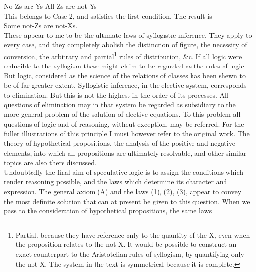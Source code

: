 \documentclass{article}
\begin{document}
{{{{No Zs are Ys \hspace*{.4in} All Zs are not-Ys\vspace{.1in}\\
\hspace*{.2in}
This belongs to Case 2, and satisfies the first condition. The result is\vspace{.1in}\\
\hspace*{.2in} Some not-Zs are not-Xs.\vspace{.1in}\\
\hspace*{.2in}
These appear to me to be the ultimate laws of syllogistic inference. They
apply to every case, and they completely abolish the distinction of figure, the
necessity of conversion, the arbitrary and partial\footnote[5]{\footnotesize{Partial, because they have reference only to the quantity of the X, even when the proposition
relates to the not-X. It would be possible to construct an exact counterpart to the
Aristotelian rules of syllogism, by quantifying only the not-X. The system in the text is
symmetrical because it is complete.}} rules of distribution, \&c. If
all logic were reducible to the syllogism these might claim to be regarded as
the rules of logic. But logic, considered as the science of the relations of classes 
has been shewn to be of far greater extent. Syllogistic inference, in the elective
system, corresponds to elimination. But this is not the highest in the order
of its processes. All questions of elimination may in that system be regarded
as subsidiary to the more general problem of the solution of elective equations.
To this problem all questions of logic and of reasoning, without exception, may
be referred. For the fuller illustrations of this principle I must however refer
to the original work. The theory of hypothetical propositions, the analysis of
the positive and negative elements, into which all propositions are ultimately
resolvable, and other similar topics are also there discussed.\vspace{.1in}\\
\hspace*{.2in}
Undoubtedly the final aim of speculative logic is to assign the conditions
which render reasoning possible, and the laws which determine its character
and expression. The general axiom (A) and the laws (1), (2), (3), appear to
convey the most definite solution that can at present be given to this question.
When we pass to the consideration of hypothetical propositions, the same laws
}}}}
\end{document}
